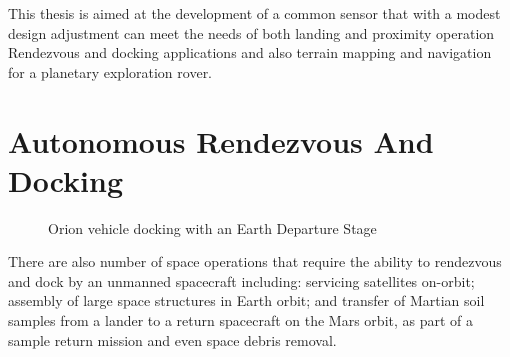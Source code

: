 This thesis is aimed at the development of a common sensor
that with a modest design adjustment can meet the needs of both landing and proximity operation Rendezvous and docking applications and also terrain mapping and navigation for a planetary exploration rover.






\section{Autonomous Rendezvous And Docking}
\begin{minipage}[H]{0.45\linewidth}
\begin{figure}[H]
\caption{Orion vehicle docking with an Earth Departure Stage }
\label{fig:docking}
\end{figure}
\end{minipage}
\hfill
\begin{minipage}[h]{0.48\linewidth}
There are also number of space operations that require the ability to rendezvous and dock by an unmanned spacecraft including:
servicing satellites on-orbit; assembly of large space structures in Earth orbit; and transfer of Martian soil samples from a lander to a return spacecraft on the Mars orbit, as part of a sample return mission and even space debris removal.
\end{minipage}
\vspace{1cm}

